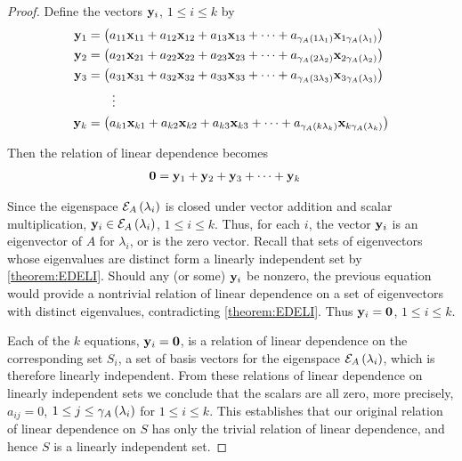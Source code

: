 \documentclass{ximera}
\begin{document}
\begin{theorem}
\begin{proof}
Define the vectors $\mathbf{y}_i$, $1\leq i\leq k$ by
\begin{align*}
\mathbf{y}_1&=\left(a_{11}\mathbf{x}_{11}+a_{12}\mathbf{x}_{12}+a_{13}\mathbf{x}_{13}+\cdots+a_{\gamma_{A}\left(1\lambda_1\right)}\mathbf{x}_{1\gamma_{A}\left(\lambda_1\right)}\right)\\
\mathbf{y}_2&=\left(a_{21}\mathbf{x}_{21}+a_{22}\mathbf{x}_{22}+a_{23}\mathbf{x}_{23}+\cdots+a_{\gamma_{A}\left(2\lambda_2\right)}\mathbf{x}_{2\gamma_{A}\left(\lambda_2\right)}\right)\\
\mathbf{y}_3&=\left(a_{31}\mathbf{x}_{31}+a_{32}\mathbf{x}_{32}+a_{33}\mathbf{x}_{33}+\cdots+a_{\gamma_{A}\left(3\lambda_3\right)}\mathbf{x}_{3\gamma_{A}\left(\lambda_3\right)}\right)\\
&\quad\quad\vdots\\
\mathbf{y}_k&=\left(a_{k1}\mathbf{x}_{k1}+a_{k2}\mathbf{x}_{k2}+a_{k3}\mathbf{x}_{k3}+\cdots+a_{\gamma_{A}\left(k\lambda_k\right)}\mathbf{x}_{k\gamma_{A}\left(\lambda_k\right)}\right)
\end{align*}




Then the relation of linear dependence becomes
\begin{align*}
\mathbf{0}&=\mathbf{y}_1+\mathbf{y}_2+\mathbf{y}_3+\cdots+\mathbf{y}_k
\end{align*}




Since the eigenspace $\mathcal{E}_{A}\left(\lambda_i\right)$ is closed under vector addition and scalar multiplication, $\mathbf{y}_i\in\mathcal{E}_{A}\left(\lambda_i\right)$, $1\leq i\leq k$.  Thus, for each $i$, the vector $\mathbf{y}_i$ is an eigenvector of $A$ for $\lambda_i$, or is the zero vector.  Recall that sets of eigenvectors whose eigenvalues are distinct form a linearly independent set by \ref{theorem:EDELI}.  Should any (or some) $\mathbf{y}_i$ be nonzero, the previous equation would provide a nontrivial relation of linear dependence on a set of eigenvectors with distinct eigenvalues, contradicting \ref{theorem:EDELI}.  Thus $\mathbf{y}_i=\mathbf{0}$, $1\leq i\leq k$.



Each of the $k$ equations, $\mathbf{y}_i=\mathbf{0}$, is a relation of linear dependence on the corresponding set $S_i$, a set of basis vectors for the eigenspace $\mathcal{E}_{A}\left(\lambda_i\right)$, which is therefore linearly independent.  From these relations of linear dependence on linearly independent sets we conclude that the scalars are all zero, more precisely, $a_{ij}=0$, $1\leq j\leq\gamma_{A}\left(\lambda_i\right)$ for $1\leq i\leq k$.  This establishes that our original relation of linear dependence on $S$ has only the trivial relation of linear dependence, and hence $S$ is a linearly independent set.




\end{proof}
\end{theorem}
\end{document}
